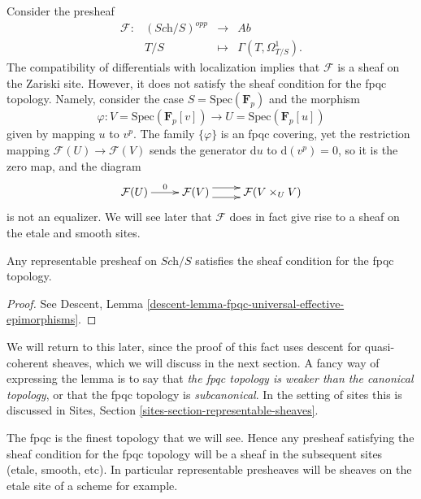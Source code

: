 \begin{example}
\label{example-quasi-coherent}
Consider the presheaf
$$
\begin{matrix}
\mathcal{F} : & (\textit{Sch}/S)^{opp} & \longrightarrow & \textit{Ab} \\
& T/S & \longmapsto & \Gamma(T, \Omega^1_{T/S}).
\end{matrix}
$$
The compatibility of differentials with localization implies that
$\mathcal{F}$ is a sheaf on the Zariski site.
However, it does not satisfy the sheaf condition for the fpqc topology.
Namely, consider the case
$S = \text{Spec}(\mathbf{F}_p)$ and the morphism
$$
\varphi :
V = \text{Spec}(\mathbf{F}_p[v])
\to
U = \text{Spec}(\mathbf{F}_p[u])
$$
given by mapping $u$ to $v^p$. The family $\{\varphi\}$ is an fpqc covering,
yet the restriction mapping
$\mathcal{F}(U) \to \mathcal{F}(V)$
sends the generator $\mathrm{d} u$ to $\mathrm{d}(v^p)
= 0$, so it is the zero map, and the diagram
$$
\xymatrix{
\mathcal{F}(U) \ar[r]^{0} &
\mathcal{F}(V) \ar@<1ex>[r] \ar@<-1ex>[r] &
\mathcal{F}(V \times_U V)
}
$$
is not an equalizer. We will see later that $\mathcal{F}$ does in fact
give rise to a sheaf on the etale and smooth sites.
\end{example}

\begin{lemma}
\label{lemma-representable-sheaf-fpqc}
Any representable presheaf on $\textit{Sch}/S$ satisfies the
sheaf condition for the fpqc topology.
\end{lemma}

\begin{proof}
See
Descent, Lemma \ref{descent-lemma-fpqc-universal-effective-epimorphisms}.
\end{proof}

\noindent
We will return to this later, since the proof of this fact uses
descent for quasi-coherent sheaves, which we will discuss in the next
section. A fancy way of expressing the lemma is to say that
{\it the fpqc topology is weaker than the canonical topology}, or
that the fpqc topology is {\it subcanonical}. In the setting of sites
this is discussed in
Sites, Section \ref{sites-section-representable-sheaves}.

\begin{remark}
\label{remark-fpqc-finest}
The fpqc is the finest topology that we will see. Hence any presheaf
satisfying the sheaf condition for the fpqc topology will be a
sheaf in the subsequent sites (etale, smooth, etc). In particular
representable presheaves will be sheaves on the etale site of a scheme
for example.
\end{remark}

